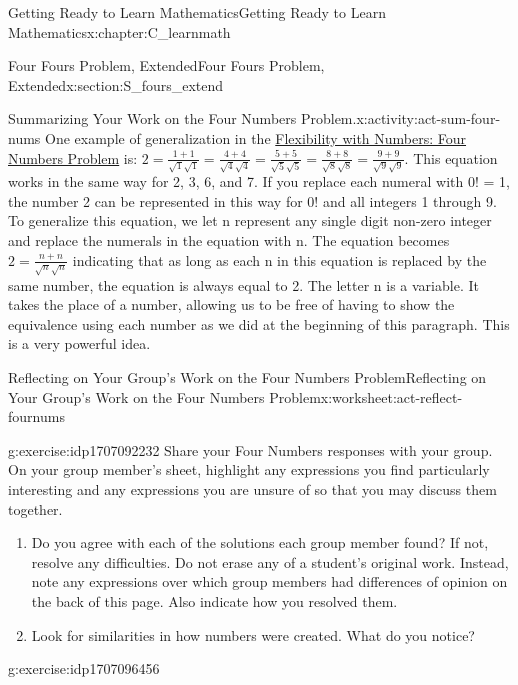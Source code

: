 \documentclass[oneside,10pt,]{book}
\numberwithin{equation}{chapter}
\begin{document}
\begin{chapterptx}{Getting Ready to Learn Mathematics}{}{Getting Ready to Learn Mathematics}{}{}{x:chapter:C_learnmath}
\begin{sectionptx}{Four Fours Problem, Extended}{}{Four Fours Problem, Extended}{}{}{x:section:S_fours_extend}
\begin{activity}{Summarizing Your Work on the Four Numbers Problem.}{x:activity:act-sum-four-nums}
One example of generalization in the \hyperref[x:worksheet:act-four-nums-prob]{Flexibility with Numbers: Four Numbers Problem} is: \(2=\frac{1+1}{\sqrt1\sqrt1}=\frac{4+4}{\sqrt4\sqrt4}=\frac{5+5}{\sqrt5\sqrt5}=\frac{8+8}{\sqrt8\sqrt8}=\frac{9+9}{\sqrt9\sqrt9}\). This equation works in the same way for 2, 3, 6, and 7. If you replace each numeral with 0! = 1, the number 2 can be represented in this way for 0! and all integers 1 through 9. To generalize this equation, we let n represent any single digit non-zero integer and replace the numerals in the equation with n. The equation becomes \(2=\frac{n+n}{\sqrt n\sqrt n}\) indicating that as long as each n in this equation is replaced by the same number, the equation is always equal to 2. The letter n is a variable. It takes the place of a number, allowing us to be free of having to show the equivalence using each number as we did at the beginning of this paragraph. This is a very powerful idea.%
\end{activity}%
%
%
\typeout{************************************************}
\typeout{************************************************}
%
\begin{worksheet-subsection}{Reflecting on Your Group's Work on the Four Numbers Problem}{}{Reflecting on Your Group's Work on the Four Numbers Problem}{}{}{x:worksheet:act-reflect-fournums}
\begin{divisionexercise}{1}{}{}{g:exercise:idp1707092232}%
Share your Four Numbers responses with your group. On your group member's sheet, highlight any expressions you find particularly interesting and any expressions you are unsure of so that you may discuss them together.%
\begin{enumerate}[font=\bfseries,label=(\alph*),ref=\alph*]
\item{}Do you agree with each of the solutions each group member found? If not, resolve any difficulties. Do not erase any of a student's original work. Instead, note any expressions over which group members had differences of opinion on the back of this page. Also indicate how you resolved them.%
\item{}Look for similarities in how numbers were created. What do you notice?%
\end{enumerate}
\end{divisionexercise}%
\begin{divisionexercise}{2}{}{}{g:exercise:idp1707096456}%

\end{divisionexercise}
\end{worksheet-subsection}
\end{sectionptx}
\end{chapterptx}
\end{document}
